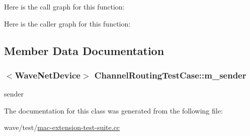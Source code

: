Here is the call graph for this function\+:




Here is the caller graph for this function\+:




\subsection{Member Data Documentation}
\subsubsection[{\texorpdfstring{m\+\_\+sender}{m_sender}}]{$<${\bf Wave\+Net\+Device}$>$ Channel\+Routing\+Test\+Case\+::m\+\_\+sender\hspace{0.3cm}{\ttfamily [private]}}\hypertarget{classChannelRoutingTestCase_a0c6b6470849719fc90bbcbe4ee70eb76}{}\label{classChannelRoutingTestCase_a0c6b6470849719fc90bbcbe4ee70eb76}


sender 



The documentation for this class was generated from the following file\+:\begin{DoxyCompactItemize}
\item 
wave/test/\hyperlink{mac-extension-test-suite_8cc}{mac-\/extension-\/test-\/suite.\+cc}\end{DoxyCompactItemize}
